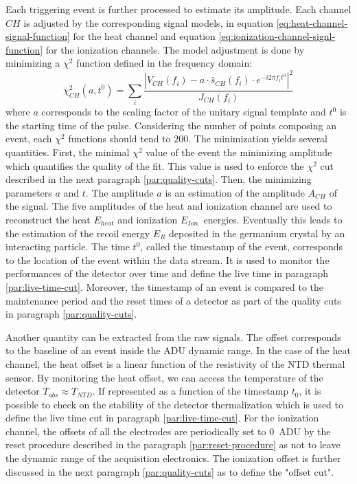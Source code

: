 Each triggering event is further processed to estimate its amplitude. Each channel $CH$ is adjusted by the corresponding signal models, in equation \ref{eq:heat-channel-signal-function} for the heat channel and equation \ref{eq:ionization-channel-signl-function} for the ionization channels. The model adjustment is done by minimizing a $\chi^2$ function defined in the frequency domain:
\begin{equation}
\chi_{CH}^2(a, t^0) =
\sum_i 
\frac{
|\hat{V}_{CH}(f_i) - a \cdot \hat{s}_{CH}(f_i) \cdot e^{-i 2 \pi f_i t^0}|^2
}{
J_{CH}(f_i)
}
\end{equation}
where $a$ corresponds to the scaling factor of the unitary signal template and $t^0$ is the starting time of the pulse. Considering the number of points composing an event, each $\chi^2$ functions should tend to $200$. The minimization yields several quantities. First, the minimal $\chi^2$ value of the event the minimizing amplitude which quantifies the quality of the fit. This value is used to enforce the $\chi^2$ cut described in the next paragraph \ref{par:quality-cuts}. Then, the minimizing parameters $a$ and $t$. The amplitude $a$ is an estimation of the amplitude $A_{CH}$ of the signal. The five amplitudes of the heat and ionization channel are used to reconstruct the heat $E_{heat}$ and ionization $E_{Ion.}$ energies. Eventually this leads to the estimation of the recoil energy $E_R$ deposited in the germanium crystal by an interacting particle. The time $t^0$, called the timestamp of the event, corresponds to the location of the event within the data stream. It is used to monitor the performances of the detector over time and define the live time in paragraph \ref{par:live-time-cut}. Moreover, the timestamp of an event is compared to the maintenance period and the reset times of a detector as part of the quality cuts in paragraph \ref{par:quality-cuts}.


Another quantity can be extracted from the raw signals. The offset corresponds to the baseline of an event inside the ADU dynamic range. In the case of the heat channel, the heat offset is a linear function of the resistivity of the NTD thermal sensor. By monitoring the heat offset, we can access the temperature of the detector $T_{abs} \approx T_{NTD}$. If represented as a function of the timestamp $t_0$, it is possible to check on the stability of the detector thermalization which is used to define the live time cut in paragraph \ref{par:live-time-cut}.
For the ionization channel, the offsets of all the electrodes are periodically set to \SI{0}{\textsf{ADU}} by the reset procedure described in the paragraph \ref{par:reset-procedure} as not to leave the dynamic range of the acquisition electronics. The ionization offset is further discussed in the next paragraph \ref{par:quality-cuts} as to define the "offset cut".

